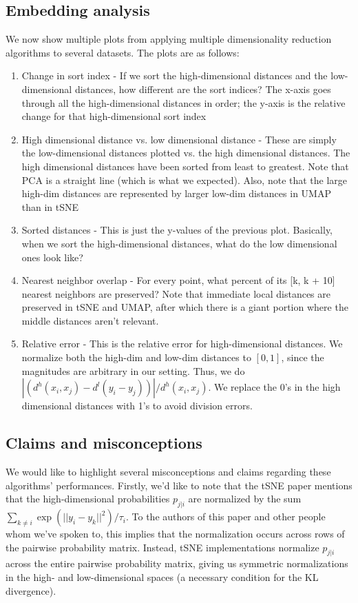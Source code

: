 \documentclass{article}
\theoremstyle{definition}
\begin{document}
\subsection{Embedding analysis}
We now show multiple plots from applying multiple dimensionality reduction algorithms to several datasets. The plots are as follows:
\begin{enumerate}
    \item Change in sort index - If we sort the high-dimensional distances and the low-dimensional distances, how different are the sort indices? The x-axis
        goes through all the high-dimensional distances in order; the y-axis is the relative change for that high-dimensional sort index
    \item High dimensional distance vs. low dimensional distance - These are simply the low-dimensional distances plotted vs. the high dimensional distances. The high dimensional distances
        have been sorted from least to greatest. Note that PCA is a straight line (which is what we expected). Also, note that the large high-dim distances are
        represented by larger low-dim distances in UMAP than in tSNE
    \item Sorted distances - This is just the y-values of the previous plot. Basically, when we sort the high-dimensional distances, what do the low
        dimensional ones look like?
    \item Nearest neighbor overlap - For every point, what percent of its [k, k + 10] nearest neighbors are preserved? Note that immediate local distances are preserved in
        tSNE and UMAP, after which there is a giant portion where the middle distances aren't relevant.
    \item Relative error - This is the relative error for high-dimensional distances. We normalize both the high-dim and low-dim distances to $[0, 1]$, since the
        magnitudes are arbitrary in our setting. Thus, we do $| (d^h(x_i, x_j) - d^l(y_i - y_j)) |/ d^h(x_i, x_j)$. We replace the 0's in the high dimensional
        distances with 1's to avoid division errors.
\end{enumerate}

\subsection{Claims and misconceptions}
We would like to highlight several misconceptions and claims regarding these algorithms' performances. Firstly, we'd like to note that the tSNE paper mentions
that the high-dimensional probabilities $p_{j|i}$ are normalized by the sum $\sum_{k \neq i} \exp\left( ||y_i - y_k||^2 \right) / \tau_i$. To the authors of
this paper and other people whom we've spoken to, this implies that the normalization occurs across rows of the pairwise probability matrix. Instead, tSNE
implementations normalize $p_{j|i}$ across the entire pairwise probability matrix, giving us symmetric normalizations in the high- and low-dimensional spaces (a
necessary condition for the KL divergence).
\end{document}

